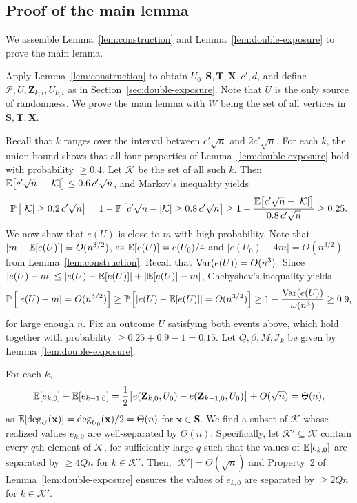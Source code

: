 \subsection{Proof of the main lemma}

We assemble Lemma~\ref{lem:construction} and Lemma~\ref{lem:double-exposure} to prove the main lemma. 

Apply Lemma~\ref{lem:construction} to obtain $U_0, \mathbf{S}, \mathbf{T}, \mathbf{X}, c', d$, and define $\mathcal{P}, U, \mathbf{Z}_{k, i}, U_{k, i}$ as in Section~\ref{sec:double-exposure}. Note that $U$ is the only source of randomness. We prove the main lemma with $W$ being the set of all vertices in $\mathbf{S}, \mathbf{T}, \mathbf{X}$.

Recall that $k$ ranges over the interval between $c'\sqrt{n}$ and $2c'\sqrt{n}$. For each $k$, the union bound shows that all four properties of Lemma~\ref{lem:double-exposure} hold with probability $\geq 0.4$. Let $\mathcal{K}$ be the set of all such $k$. Then $\mathbb{E}\bigl[c'\sqrt{n} - |\mathcal{K}|\bigr] \leq 0.6 \, c'\sqrt{n}$, and Markov's inequality yields
\[
  \mathbb{P}\left[|\mathcal{K}| \geq 0.2 \, c'\sqrt{n}\right] = 1 - \mathbb{P}\left[c'\sqrt{n} - |\mathcal{K}| \geq 0.8 \, c'\sqrt{n}\right] \geq 1 - \frac{\mathbb{E}\bigl[c'\sqrt{n} - |\mathcal{K}|\bigr]}{0.8 \, c'\sqrt{n}} \geq 0.25.
\]
We now show that $e(U)$ is close to $m$ with high probability. Note that $|m - \mathbb{E}[e(U)]| = O(n^{3/2})$, as $\mathbb{E}[e(U)] = e(U_0)/4$ and $|e(U_0) - 4m| = O(n^{3/2})$ from Lemma~\ref{lem:construction}. Recall that $\operatorname{Var}(e(U)) = O(n^3)$. Since $|e(U) - m| \leq |e(U) - \mathbb{E}[e(U)]| + |\mathbb{E}[e(U)] - m|$, Chebyshev's inequality yields
\[
  \mathbb{P}\left[|e(U) - m| = O(n^{3/2})\right] \geq \mathbb{P}\left[|e(U) - \mathbb{E}[e(U)]| = O(n^{3/2})\right] \geq 1 - \frac{\operatorname{Var}(e(U))}{\omega(n^{3})} \geq 0.9,
\]
for large enough $n$. Fix an outcome $U$ satisfying both events above, which hold together with probability $\geq 0.25 + 0.9 - 1 = 0.15$. Let $Q, \beta, M, \mathcal{I}_k$ be given by Lemma~\ref{lem:double-exposure}. 

For each $k$, 
\[
  \mathbb{E}[e_{k, 0}] - \mathbb{E}[e_{k - 1, 0}] = \frac{1}{2}\bigl[e(\mathbf{Z}_{k, 0}, U_0) - e(\mathbf{Z}_{k - 1, 0}, U_0)\bigr] + O(\sqrt{n}) = \Theta(n),
\]
as $\mathbb{E}[\operatorname{deg}_U(\mathbf{x})] = \operatorname{deg}_{U_0}(\mathbf{x})/2 = \Theta(n)$ for $\mathbf{x} \in \mathbf{S}$. We find a subset of $\mathcal{K}$ whose realized values $e_{k, 0}$ are well-separated by $\Theta(n)$. Specifically, let $\mathcal{K}' \subseteq \mathcal{K}$ contain every $q$th element of $\mathcal{K}$, for sufficiently large $q$ such that the values of $\mathbb{E}[e_{k, 0}]$ are separated by $\geq 4Qn$ for $k \in \mathcal{K}'$. Then, $|\mathcal{K}'| = \Theta(\sqrt{n})$ and Property~2 of Lemma~\ref{lem:double-exposure} ensures the values of $e_{k, 0}$ are separated by $\geq 2Qn$ for $k \in \mathcal{K}'$. 

